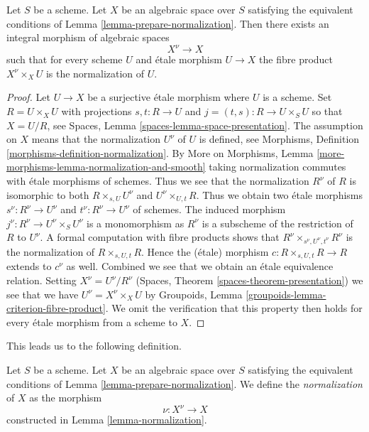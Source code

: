 \begin{lemma}
\label{lemma-normalization}
Let $S$ be a scheme. Let $X$ be an algebraic space over $S$ satisfying
the equivalent conditions of Lemma \ref{lemma-prepare-normalization}.
Then there exists an integral morphism of algebraic spaces
$$
X^\nu \longrightarrow X
$$
such that for every scheme $U$ and \'etale morphism $U \to X$
the fibre product $X^\nu \times_X U$ is the normalization of $U$.
\end{lemma}

\begin{proof}
Let $U \to X$ be a surjective \'etale morphism where $U$ is a scheme.
Set $R = U \times_X U$ with projections $s, t : R \to U$ and
$j = (t, s) : R \to U \times_S U$ so that $X = U/R$, see
Spaces, Lemma \ref{spaces-lemma-space-presentation}.
The assumption on $X$ means that the normalization $U^\nu$ of $U$
is defined, see Morphisms, Definition
\ref{morphisms-definition-normalization}.
By More on Morphisms, Lemma
\ref{more-morphisms-lemma-normalization-and-smooth}
taking normalization commutes with \'etale morphisms of schemes.
Thus we see that the normalization $R^\nu$ of $R$
is isomorphic to both $R \times_{s, U} U^\nu$ and $U^\nu \times_{U, t} R$.
Thus we obtain two \'etale morphisms
$s^\nu : R^\nu \to U^\nu$ and $t^\nu : R^\nu \to U^\nu$
of schemes. The induced morphism $j^\nu : R^\nu \to U^\nu \times_S U^\nu$
is a monomorphism as $R^\nu$ is a subscheme of the restriction of
$R$ to $U^\nu$. A formal computation with fibre products shows that
$R^\nu \times_{s^\nu, U^\nu, t^\nu} R^\nu$ is the normalization
of $R \times_{s, U, t} R$. Hence the (\'etale) morphism
$c : R \times_{s, U, t} R \to R$ extends to $c^\nu$ as well.
Combined we see that we obtain an \'etale equivalence relation.
Setting $X^\nu = U^\nu/R^\nu$
(Spaces, Theorem \ref{spaces-theorem-presentation})
we see that we have $U^\nu = X^\nu \times_X U$ by
Groupoids, Lemma \ref{groupoids-lemma-criterion-fibre-product}.
We omit the verification that this property then holds for every
\'etale morphism from a scheme to $X$.
\end{proof}

\noindent
This leads us to the following definition.

\begin{definition}
\label{definition-normalization}
Let $S$ be a scheme. Let $X$ be an algebraic space over $S$ satisfying the
equivalent conditions of Lemma \ref{lemma-prepare-normalization}.
We define the {\it normalization} of $X$ as the morphism
$$
\nu : X^\nu \longrightarrow X
$$
constructed in Lemma \ref{lemma-normalization}.
\end{definition}

